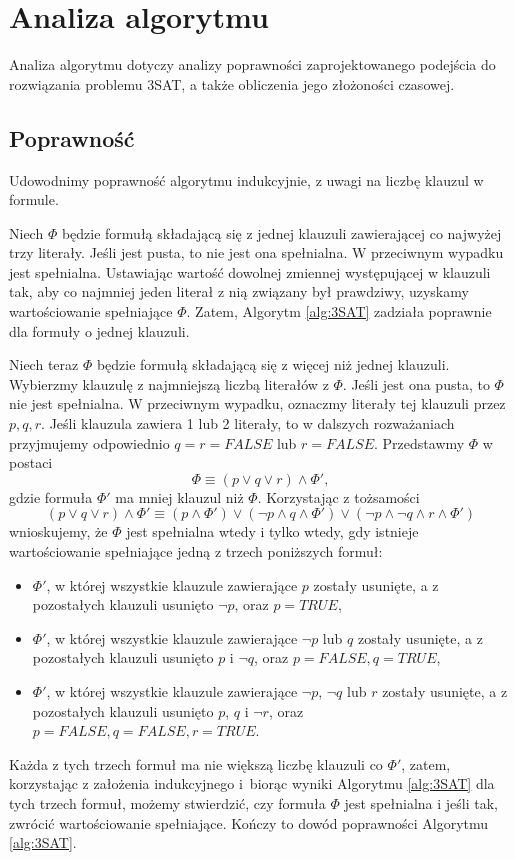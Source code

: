 \documentclass[a4paper,10pt,twoside]{report}
\theoremstyle{definition}
\begin{document}
\section{Analiza algorytmu}

Analiza algorytmu dotyczy analizy poprawności zaprojektowanego podejścia do rozwiązania problemu 3SAT, a także obliczenia jego złożoności czasowej.

\subsection{Poprawność}

Udowodnimy poprawność algorytmu indukcyjnie, z uwagi na liczbę klauzul w formule. 

Niech $\Phi$ będzie formułą składającą się z jednej klauzuli zawierającej co najwyżej trzy literały. Jeśli jest pusta, to nie jest ona spełnialna. W przeciwnym wypadku jest spełnialna. Ustawiając wartość dowolnej zmiennej występującej w klauzuli tak, aby co najmniej jeden literał z nią związany był prawdziwy, uzyskamy wartościowanie spełniające $\Phi$. Zatem, Algorytm \ref{alg:3SAT} zadziała poprawnie dla formuły o jednej klauzuli.

Niech teraz $\Phi$ będzie formułą składającą się z więcej niż jednej klauzuli. Wybierzmy  klauzulę z najmniejszą liczbą literałów z $\Phi$. Jeśli jest ona pusta, to $\Phi$ nie jest spełnialna. W przeciwnym wypadku, oznaczmy literały tej klauzuli przez $p,q,r$. Jeśli klauzula zawiera 1 lub 2 literały, to w dalszych rozważaniach przyjmujemy odpowiednio $q=r=FALSE$ lub $r=FALSE$. Przedstawmy $\Phi$ w postaci
\begin{equation}
    \Phi \equiv (p\vee q\vee r) \wedge \Phi',
\end{equation}
gdzie formuła $\Phi'$ ma mniej klauzul niż $\Phi$. Korzystając z tożsamości
\begin{equation}
    (p\vee q\vee r) \wedge \Phi' \equiv (p \wedge \Phi') \vee (\neg p \wedge q \wedge \Phi') \vee (\neg p\wedge \neg q\wedge r \wedge \Phi')
\end{equation}
wnioskujemy, że $\Phi$ jest spełnialna wtedy i tylko wtedy, gdy istnieje wartościowanie spełniające jedną z trzech poniższych formuł:
\begin{itemize}
    \item $\Phi'$, w której wszystkie klauzule zawierające $p$ zostały usunięte, a z pozostałych klauzuli usunięto $\neg p$, oraz $p=TRUE$,
    \item $\Phi'$, w której wszystkie klauzule zawierające $\neg p$ lub $q$ zostały usunięte, a z pozostałych klauzuli usunięto $p$ i $\neg q$, oraz $p=FALSE, q=TRUE$,
    \item $\Phi'$, w której wszystkie klauzule zawierające $\neg p$, $\neg q$ lub $r$ zostały usunięte, a z pozostałych klauzuli usunięto $p$, $q$ i $\neg r$, oraz $p=FALSE, q=FALSE, r=TRUE$.
\end{itemize}
Każda z tych trzech formuł ma nie większą liczbę klauzuli co $\Phi'$, zatem, korzystając z założenia indukcyjnego i~biorąc wyniki Algorytmu \ref{alg:3SAT} dla tych trzech formuł, możemy stwierdzić, czy formuła $\Phi$ jest spełnialna i jeśli tak, zwrócić wartościowanie spełniające. Kończy to dowód poprawności Algorytmu \ref{alg:3SAT}.
\end{document}
